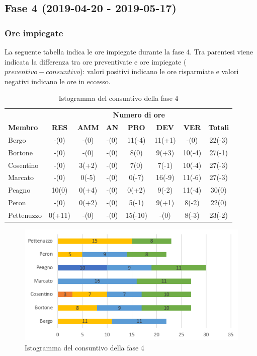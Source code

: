 \newpage
\subsection{Fase 4 (2019-04-20 - 2019-05-17)}
	\subsubsection{Ore impiegate}
	La seguente tabella indica le ore impiegate durante la fase 4. Tra parentesi viene indicata la differenza tra ore preventivate e ore impiegate ($preventivo - consuntivo$): valori positivi indicano le ore risparmiate e valori negativi indicano le ore in eccesso.
	
	\begin{table}[H]
		\centering
		\begin{tabular}{| l | c c c c c c | c |}
			\rowcolor{LightBlue}
			& \multicolumn{7}{c}{\textbf{\color{white}Numero di ore}}	\\
			
			\rowcolor{LightBlue}
			\textbf{\color{white}Membro}
			& \textbf{\color{white}RES}
			& \textbf{\color{white}AMM}
			& \textbf{\color{white}AN}
			& \textbf{\color{white}PRO}
			& \textbf{\color{white}DEV}
			& \textbf{\color{white}VER}
			& \textbf{\color{white}Totali}\\
			Bergo & -(0) & -(0) & -(0) & 11(-4) & 11(+1) & -(0) & 22(-3)\\
			Bortone & -(0) & -(0) & -(0) & 8(0) & 9(+3) & 10(-4) & 27(-1)\\
			Cosentino & -(0) & 3(+2) & -(0) & 7(0) & 7(-1) & 10(-4) & 27(-3)\\
			Marcato  & -(0) & 0(-5) & -(0) & 0(-7) & 16(-9) & 11(-6) & 27(-3)\\
			Peagno & 10(0) & 0(+4) & -(0) & 0(+2) & 9(-2) & 11(-4) & 30(0)\\
			Peron   & -(0) & 0(+2) & -(0) & 5(-1) & 9(+1) &  8(-2)	& 22(0)\\
			Pettenuzzo & 0(+11) & -(0) & -(0) & 15(-10) & -(0) & 8(-3) & 23(-2)\\ \hline
		\end{tabular}
		\caption{Ore di lavoro impiegate per membro/ruolo della fase 4}
		
		\begin{figure}[H]
			\centering
			\includegraphics[scale=1]{images/consuntivoRA.png}
			\caption{Istogramma del consuntivo della fase 4}
		\end{figure}
	\end{table}
	
